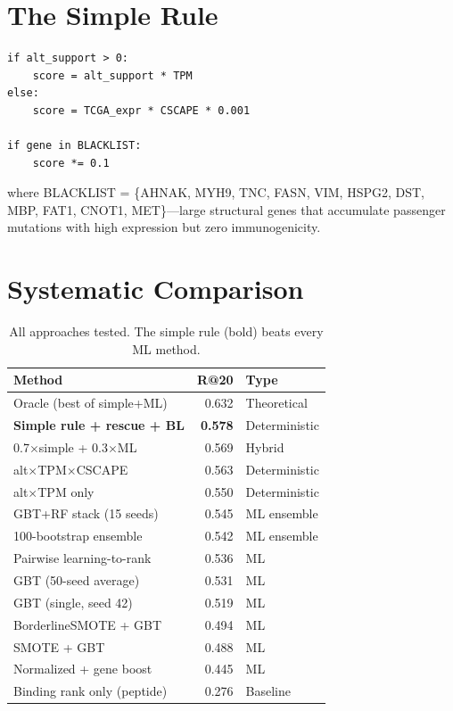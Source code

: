 \documentclass[11pt,twocolumn]{article}
\begin{document}
\section{The Simple Rule}

\begin{verbatim}
if alt_support > 0:
    score = alt_support * TPM
else:
    score = TCGA_expr * CSCAPE * 0.001

if gene in BLACKLIST:
    score *= 0.1
\end{verbatim}

where BLACKLIST = \{AHNAK, MYH9, TNC, FASN, VIM, HSPG2, DST, MBP,
FAT1, CNOT1, MET\}---large structural genes that accumulate passenger
mutations with high expression but zero immunogenicity.

\section{Systematic Comparison}

\begin{table}[h]
\centering
\small
\begin{tabular}{lrl}
\toprule
\textbf{Method} & \textbf{R@20} & \textbf{Type} \\
\midrule
Oracle (best of simple+ML) & 0.632 & Theoretical \\
\textbf{Simple rule + rescue + BL} & \textbf{0.578} & Deterministic \\
0.7$\times$simple + 0.3$\times$ML & 0.569 & Hybrid \\
alt$\times$TPM$\times$CSCAPE & 0.563 & Deterministic \\
alt$\times$TPM only & 0.550 & Deterministic \\
GBT+RF stack (15 seeds) & 0.545 & ML ensemble \\
100-bootstrap ensemble & 0.542 & ML ensemble \\
Pairwise learning-to-rank & 0.536 & ML \\
GBT (50-seed average) & 0.531 & ML \\
GBT (single, seed 42) & 0.519 & ML \\
BorderlineSMOTE + GBT & 0.494 & ML \\
SMOTE + GBT & 0.488 & ML \\
Normalized + gene boost & 0.445 & ML \\
Binding rank only (peptide) & 0.276 & Baseline \\
\bottomrule
\end{tabular}
\caption{All approaches tested. The simple rule (bold) beats every ML method.}
\end{table}
\end{document}
